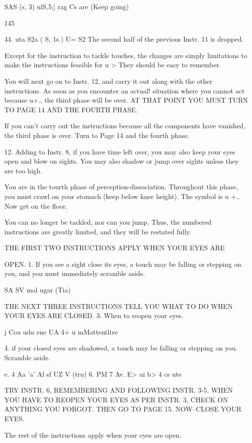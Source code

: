 \documentclass[10pt,twoside]{memoir}
\begin{document}
\begin{enumerate}
{\begin{enumerate}
\begin{sysrules}
\begin{sysrules}
\begin{sysrules}
\begin{sysrules}
{\begin{enumerate}
{{{{{{{SAS (s, 3) ulS,5;] 
rag Cs are 
(Keep going) 


145 


44. uta S2a ( S, 1s.) U= S2 
The second half of the previous Instr. 11 is dropped. 


Except for the instruction to tackle touches, the changes are simply 
limitations to make the instructions feasible for u > They should be easy 
to remember. 


You will next go on to Instr. 12, and carry it out along with the other 
instructions. As soon as you encounter an actual! situation where you cannot 
act because u+., the third phase will be over. AT THAT POINT YOU 
MUST TURN TO PAGE 14 AND THE FOURTH PHASE. 


If you can't carry out the instructions because all the components have 
vanished, the third phase is over. Turn to Page 14 and the fourth phase. 


12. Adding to Instr. 8, if you have time left over, you may also keep 
your eyes open and blow on sights. You may also shadow or jump over 
sights unless they are too high. 


You are in the tourth phase of perception-dissociation. Throughout this 
phase, you must crawl on your stomach (keep below knee height). The 
symbol is u +.. Now get on the floor. 

You can no longer be tackled, nor can you jump. Thus, the numbered 
instructions are greatly limited, and they will be restated fully. 

THE FIRST TWO INSTRUCTIONS APPLY WHEN YOUR EYES ARE 


OPEN. 
1. If you see a sight close its eyes, a touch may be falling or stepping 
on you, and you must immediately scramble aside. 


SA SV mal 
ugar (Tia) 


THE NEXT THREE INSTRUCTIONS TELL YOU WHAT TO DO 
WHEN YOUR EYES ARE CLOSED. 
3. When to reopen your eyes. 


j Cou 
udu ene UA 
4+ u mMattentlive 


4. if your closed eyes are shadowed, a touch may be falling or 
stepping on you. Scramble aside. 


e. 4 Aa 'a' Al sf 
UZ V (tru) 
6. PM 
7 Av. E> ui b> 
4 cs ute 


TRY INSTR. 6, REMEMBERING AND FOLLOWING INSTR. 3-5. 
WHEN YOU HAVE TO REOPEN YOUR EYES AS PER INSTR. 3, CHECK 
ON ANYTHING YOU FORGOT. THEN GO TO PAGE 15. NOW--CLOSE 
YOUR EYES. 


The rest of the instructions apply when your eyes are open. 


}}}}}}}
\end{enumerate}}
\end{sysrules}
\end{sysrules}
\end{sysrules}
\end{sysrules}
\end{enumerate}}
\end{enumerate}
\end{document}
